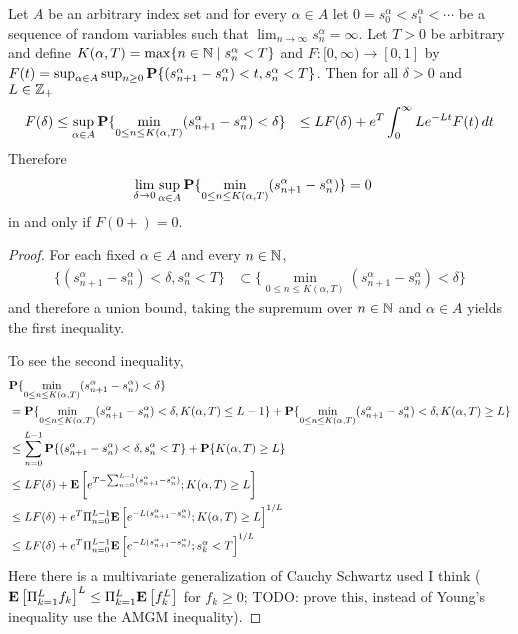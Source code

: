 \begin{lem}\label{SkorohodInfiniteModulusOfContinuityPullOutMin}Let $A$ be an arbitrary index set and for every $\alpha \in A$ let $0=s^\alpha_0 < s^\alpha_1 < \dotsb$ be a sequence of random variables such that $\lim_{n \to \infty} s^\alpha_n = \infty$.  Let $T > 0$ be arbitrary and define $K(\alpha,T) = \max \lbrace n \in \mathbb{N} \mid s^\alpha_n < T \rbrace$ and $F : [0,\infty) \to [0,1]$ by $F(t) = \sup_{\alpha \in A} \sup_{n \geq 0} \textbf{P}\{(s^\alpha_{n+1} - s^\alpha_n) < t , s^\alpha_n < T\}$.  Then for all $\delta > 0$ and $L \in \mathbb{Z}_+$ 
\begin{align*}
F(\delta) &\leq \sup_{\alpha \in A} \textbf{P}\{\min_{0 \leq n \leq K(\alpha, T)} (s^\alpha_{n+1} - s^\alpha_n) < \delta\} &\leq LF(\delta) + e^T \int_0^\infty L e^{-Lt} F(t) \, dt
\end{align*}
Therefore
\begin{align*}
\lim_{\delta \to 0} \sup_{\alpha \in A} \textbf{P}\{\min_{0 \leq n \leq K(\alpha, T)} (s^\alpha_{n+1} - s^\alpha_n) \} &= 0
\end{align*}
in and only if $F(0+) = 0$.
\end{lem}
\begin{proof}
For each fixed $\alpha \in A$ and every $n \in \mathbb{N}$, 
\begin{align*}
\lbrace (s^\alpha_{n+1} - s^\alpha_n) < \delta , s^\alpha_n < T \rbrace &\subset \lbrace \min_{0 \leq n \leq K(\alpha, T)} (s^\alpha_{n+1} - s^\alpha_n) < \delta \rbrace
\end{align*}
and therefore a union bound, taking the supremum over $n \in \mathbb{N}$ and $\alpha \in A$ yields the first inequality.

To see the second inequality, 
\begin{align*}
&\textbf{P}\{\min_{0 \leq n \leq K(\alpha, T)} (s^\alpha_{n+1} - s^\alpha_n) < \delta\} \\
&=\textbf{P}\{\min_{0 \leq n \leq K(\alpha,T)} (s^\alpha_{n+1} - s^\alpha_n) < \delta, K(\alpha, T) \leq L-1\} + \textbf{P}\{\min_{0 \leq n \leq K(\alpha,T)} (s^\alpha_{n+1} - s^\alpha_n) < \delta, K(\alpha, T) \geq L\} \\
&\leq \sum_{n=0}^{L-1} \textbf{P}\{(s^\alpha_{n+1} - s^\alpha_n) < \delta, s^\alpha_n < T\}  + \textbf{P}\{K(\alpha, T) \geq L\} \\
&\leq L F(\delta) + \textbf{E}\left[e^{T - \sum_{n=0}^{L-1} (s^\alpha_{n+1} - s^\alpha_n)} ; K(\alpha, T) \geq L\right] \\
&\leq L F(\delta) + e^T \Pi_{n=0}^{L-1} \textbf{E}\left[e^{-L(s^\alpha_{n+1} - s^\alpha_n)}; K(\alpha, T) \geq L\right]^{1/L} \\
&\leq L F(\delta) + e^T \Pi_{n=0}^{L-1} \textbf{E}\left[e^{-L(s^\alpha_{n+1} - s^\alpha_n)}; s^\alpha_k < T\right]^{1/L} \\
\end{align*}
Here there is a multivariate generalization of Cauchy Schwartz used I think ($\textbf{E}\left[\Pi_{k=1}^L f_k\right]^L \leq \Pi_{k=1}^L \textbf{E}\left[f^L_k\right]$ for $f_k \geq 0$; TODO: prove this, instead of Young's inequality use the AMGM inequality).
\end{proof}

